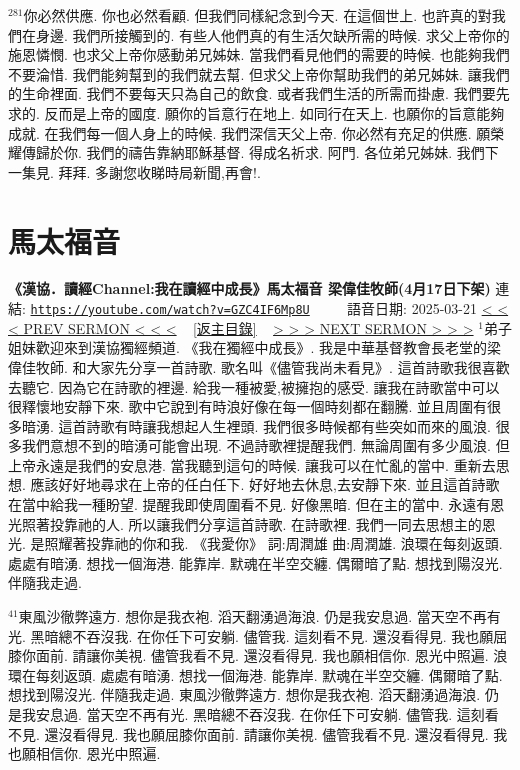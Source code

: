 \documentclass{book}
\begin{document}
$^{281}$你必然供應.
你也必然看顧.
但我們同樣紀念到今天.
在這個世上.
也許真的對我們在身邊.
我們所接觸到的.
有些人他們真的有生活欠缺所需的時候.
求父上帝你的施恩憐憫.
也求父上帝你感動弟兄姊妹.
當我們看見他們的需要的時候.
也能夠我們不要淪惜.
我們能夠幫到的我們就去幫.
但求父上帝你幫助我們的弟兄姊妹.
讓我們的生命裡面.
我們不要每天只為自己的飲食.
或者我們生活的所需而掛慮.
我們要先求的.
反而是上帝的國度.
願你的旨意行在地上.
如同行在天上.
也願你的旨意能夠成就.
在我們每一個人身上的時候.
我們深信天父上帝.
你必然有充足的供應.
願榮耀傳歸於你.
我們的禱告靠納耶穌基督.
得成名祈求.
阿門.
各位弟兄姊妹.
我們下一集見.
拜拜.
多謝您收睇時局新聞,再會!.
\newpage



\section{馬太福音}
\label{sec:GZC4IF6Mp8U}
\textbf{《漢協．讀經Channel:我在讀經中成長》馬太福音 梁偉佳牧師(4月17日下架)}
\newline
\newline
連結: \href{https://youtube.com/watch?v=GZC4IF6Mp8U}{\texttt{https://youtube.com/watch?v=GZC4IF6Mp8U}} ~~~~ 語音日期: 2025-03-21
\newline
\newline
\hyperref[sec:Rt9I2F6zVuw]{\small{< < < PREV SERMON < < <}}
~
\hyperref[sec:index]{\small{[返主目錄]}}
~
\hyperref[sec:HhgTqAX1BFU]{\small{> > > NEXT SERMON > > >}}
\newline
\newline
$^{1}$弟子姐妹歡迎來到漢協獨經頻道.
《我在獨經中成長》.
我是中華基督教會長老堂的梁偉佳牧師.
和大家先分享一首詩歌.
歌名叫《儘管我尚未看見》.
這首詩歌我很喜歡去聽它.
因為它在詩歌的裡邊.
給我一種被愛,被擁抱的感受.
讓我在詩歌當中可以很釋懷地安靜下來.
歌中它說到有時浪好像在每一個時刻都在翻騰.
並且周圍有很多暗湧.
這首詩歌有時讓我想起人生裡頭.
我們很多時候都有些突如而來的風浪.
很多我們意想不到的暗湧可能會出現.
不過詩歌裡提醒我們.
無論周圍有多少風浪.
但上帝永遠是我們的安息港.
當我聽到這句的時候.
讓我可以在忙亂的當中.
重新去思想.
應該好好地尋求在上帝的任白任下.
好好地去休息,去安靜下來.
並且這首詩歌在當中給我一種盼望.
提醒我即使周圍看不見.
好像黑暗.
但在主的當中.
永遠有恩光照著投靠祂的人.
所以讓我們分享這首詩歌.
在詩歌裡.
我們一同去思想主的恩光.
是照耀著投靠祂的你和我.
《我愛你》 詞:周潤雄 曲:周潤雄.
浪環在每刻返頭.
處處有暗湧.
想找一個海港.
能靠岸.
默魂在半空交纏.
偶爾暗了點.
想找到陽沒光.
伴隨我走過.

$^{41}$東風沙徹弊遠方.
想你是我衣袍.
滔天翻湧過海浪.
仍是我安息過.
當天空不再有光.
黑暗總不吞沒我.
在你任下可安躺.
儘管我.
這刻看不見.
還沒看得見.
我也願屈膝你面前.
請讓你美視.
儘管我看不見.
還沒看得見.
我也願相信你.
恩光中照遍.
浪環在每刻返頭.
處處有暗湧.
想找一個海港.
能靠岸.
默魂在半空交纏.
偶爾暗了點.
想找到陽沒光.
伴隨我走過.
東風沙徹弊遠方.
想你是我衣袍.
滔天翻湧過海浪.
仍是我安息過.
當天空不再有光.
黑暗總不吞沒我.
在你任下可安躺.
儘管我.
這刻看不見.
還沒看得見.
我也願屈膝你面前.
請讓你美視.
儘管我看不見.
還沒看得見.
我也願相信你.
恩光中照遍.
\end{document}
